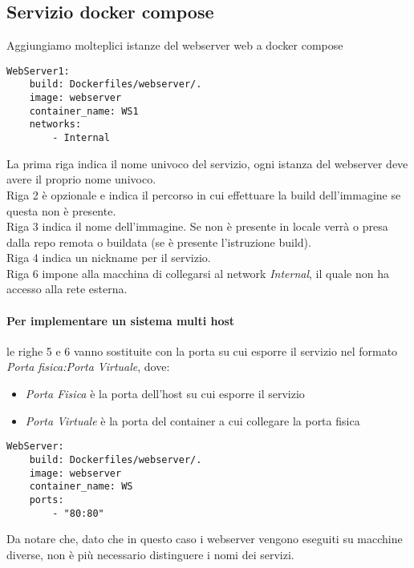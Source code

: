 \documentclass[../DocumentazioneProgetto.tex]{subfiles}
\begin{document}
	\subsection{Servizio docker compose} 
	\label{sec:WebserverDockerCompose}
	Aggiungiamo molteplici istanze del webserver web a docker compose
	\begin{lstlisting}[caption=Webserver Docker Compose] 
WebServer1:
	build: Dockerfiles/webserver/.
	image: webserver
	container_name: WS1
	networks:
		- Internal\end{lstlisting}
	La prima riga indica il nome univoco del servizio, ogni istanza del webserver deve avere il proprio nome univoco.\\
	Riga 2 è opzionale e indica il percorso in cui effettuare la build dell'immagine se questa non è presente.\\
	Riga 3 indica il nome dell'immagine. Se non è presente in locale verrà o presa dalla repo remota o buildata (se è presente l'istruzione build).\\
	Riga 4 indica un nickname per il servizio.\\
	Riga 6 impone alla macchina di collegarsi al network \textit{Internal}, il quale non ha accesso alla rete esterna. 
	\paragraph{Per implementare un sistema multi host} le righe 5 e 6 vanno sostituite con la porta su cui esporre il servizio nel formato \textit{Porta fisica:Porta Virtuale}, 
	dove:
	\begin{itemize}
		\item \textit{Porta Fisica} è la porta dell'host su cui esporre il servizio
		\item \textit{Porta Virtuale} è la porta del container a cui collegare la porta fisica 
	\end{itemize}
	\begin{lstlisting}[caption=Webserver Docker Compose in multi host] 
WebServer:
	build: Dockerfiles/webserver/.
	image: webserver
	container_name: WS
	ports:
		- "80:80"\end{lstlisting}
	Da notare che, dato che in questo caso i webserver vengono eseguiti su macchine diverse, non è più necessario distinguere i nomi dei servizi.
\end{document}
